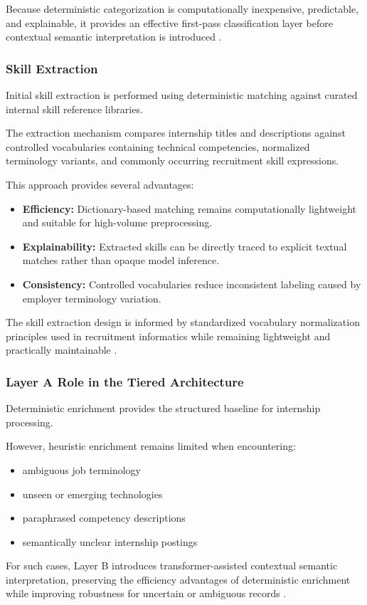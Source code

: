 Because deterministic categorization is computationally inexpensive, predictable, and explainable, it provides an effective first-pass classification layer before contextual semantic interpretation is introduced \cite{sarawagi2008information}.

\subsubsection*{Skill Extraction}

Initial skill extraction is performed using deterministic matching against curated internal skill reference libraries.

The extraction mechanism compares internship titles and descriptions against controlled vocabularies containing technical competencies, normalized terminology variants, and commonly occurring recruitment skill expressions.

This approach provides several advantages:
\begin{itemize}[leftmargin=1.4em,itemsep=0.25em,topsep=0.25em]
\item \textbf{Efficiency:} Dictionary-based matching remains computationally lightweight and suitable for high-volume preprocessing.
\item \textbf{Explainability:} Extracted skills can be directly traced to explicit textual matches rather than opaque model inference.
\item \textbf{Consistency:} Controlled vocabularies reduce inconsistent labeling caused by employer terminology variation.
\end{itemize}
The skill extraction design is informed by standardized vocabulary normalization principles used in recruitment informatics while remaining lightweight and practically maintainable \cite{esco2024, pappas2022jobbert}.

\subsubsection*{Layer A Role in the Tiered Architecture}

Deterministic enrichment provides the structured baseline for internship processing.

However, heuristic enrichment remains limited when encountering:
\begin{itemize}[leftmargin=1.4em,itemsep=0.25em,topsep=0.25em]
\item ambiguous job terminology
\item unseen or emerging technologies
\item paraphrased competency descriptions
\item semantically unclear internship postings
\end{itemize}
For such cases, Layer B introduces transformer-assisted contextual semantic interpretation, preserving the efficiency advantages of deterministic enrichment while improving robustness for uncertain or ambiguous records \cite{reimers2019sentence, schwartz2020green}.

